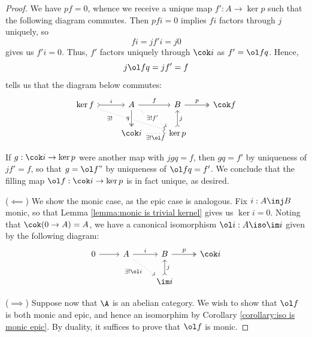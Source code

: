 \documentclass[12pt]{amsart}
\theoremstyle{definition}
\begin{document}
\begin{proof}
  We have $pf=0$, whence we receive a unique map $f':A\to \ker p$ such that the following diagram commutes.
  Then $pfi = 0$ implies $fi$ factors through $j$ uniquely, so
  \[
    fi=jf'i=j0
  \] 
  gives us $f'i=0$.
  Thus, $f'$ factors uniquely through $\cok i$ as $f'=\ol fq$.
  Hence, 
  \[
    j\ol fq= jf'=f
  \]
  tells us that the diagram below commutes:
  \[
    \begin{tikzcd}
      \ker f\ar[r,tail,"i"]\ar[drr,dotted,"\exists!"',near start]
      & A\ar[d,twoheadrightarrow,"q"', crossing over]\ar[r,"f"]\ar[dr,dotted,"\exists!f'" description]
                            & B\ar[r,twoheadrightarrow, "p"] & \cok f \\
                            & \cok i\ar[r,dotted,"\exists!\ol f"'] & \ker p\ar[u,tail,"j"']
    \end{tikzcd}
  \] 

  If $g:\cok i\to \ker p$ were another map with $jgq=f$, then $gq=f'$ by uniqueness of $jf'=f$, so that $g=\ol f"$ by uniqueness of $\ol f q = f'$.
  We conclude that the filling map $\ol f:\cok i\to \ker p$ is in fact unique, as desired.

  ($\impliedby$) We show the monic case, as the epic case is analogous.
  Fix $i:A\inj B$ monic, so that Lemma \ref{lemma:monic is trivial kernel} gives us $\ker i=0$.
  Noting that $\cok(0\to A)=A$, we have a canonical isomorphism $\ol i:A\iso\im i$ given by the following diagram:
  \[
    \begin{tikzcd}
      0\ar[r] & A\ar[r,"i"]\ar[dr,dotted, "\exists!\ol i"']
                            & B\ar[r,twoheadrightarrow, "p"] & \cok i \\
                            && \im i\ar[u,tail,"j"']
    \end{tikzcd}
  \] 

  ($\implies$) Suppose now that $\A$ is an abelian category.
  We wish to show that $\ol f$ is both monic and epic, and hence an isomorphim by Corollary \ref{corollary:iso is monic epic}.
  By duality, it suffices to prove that $\ol f$ is monic.


\end{proof}
\end{document}
